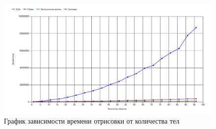 
\begin{figure}[H]
    \centering
    \includegraphics[width=1\linewidth]{img/graph_obj.png}
    \caption{График зависимости времени отрисовки от количества тел}
    \label{fig:obj}
\end{figure}

